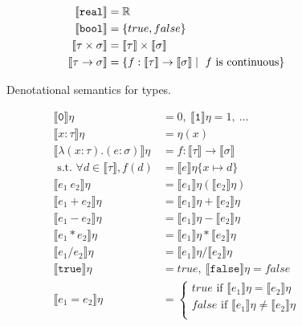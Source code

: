 \begin{figure}
 \begin{align*}
\llbracket \texttt{real} \rrbracket &= \mathbb{R} \\
 \llbracket \texttt{bool} \rrbracket &= {\{true, false\}} \\
 \llbracket \tau \times \sigma \rrbracket &= \llbracket \tau \rrbracket \times \llbracket \sigma \rrbracket  \\
 \llbracket \tau \rightarrow \sigma \rrbracket &= \{f: \llbracket \tau \rrbracket \rightarrow \llbracket \sigma \rrbracket \mid
 \ f \text{ is continuous}\} 
 \end{align*}
 \caption{Denotational semantics for types.}
 \label{fig:densemtypes}
 \end{figure}
 \begin{figure}
\begin{align*}
 \llbracket \texttt{0} \rrbracket\eta &= 0, \  \llbracket \texttt{1} \rrbracket\eta = 1, \ \ldots \\
  \llbracket x : \tau \rrbracket\eta &= \eta(x) \\
  \llbracket \lambda (x : \tau) . (e : \sigma) \rrbracket\eta &= f : \llbracket \tau \rrbracket \rightarrow \llbracket \sigma \rrbracket \\
\text{ s.t. } \forall d \in \llbracket \tau \rrbracket, f(d) &= \llbracket e \rrbracket\eta\{ x \mapsto d \} \\
 \llbracket e_1 \ e_2 \rrbracket \eta &= \llbracket e_1 \rrbracket\eta ( \llbracket e_2 \rrbracket\eta ) \\
 \llbracket e_1 + e_2 \rrbracket\eta &= \llbracket e_1 \rrbracket\eta + \llbracket e_2 \rrbracket\eta \\
 \llbracket e_1 - e_2 \rrbracket\eta &= \llbracket e_1 \rrbracket\eta - \llbracket e_2 \rrbracket\eta \\
 \llbracket e_1 * e_2 \rrbracket\eta &= \llbracket e_1 \rrbracket\eta * \llbracket e_2 \rrbracket\eta \\
  \llbracket e_1 / e_2 \rrbracket\eta &= \llbracket e_1 \rrbracket\eta / \llbracket e_2 \rrbracket\eta \\
  \llbracket \texttt{true} \rrbracket\eta &= true, \ \llbracket \texttt{false} \rrbracket\eta = false \\
 \llbracket e_1 = e_2 \rrbracket\eta &= 
 \begin{cases} 
      true \text{ if } \llbracket e_1 \rrbracket\eta = \llbracket e_2 \rrbracket\eta \\
      false \text{  if } \llbracket e_1 \rrbracket\eta \neq \llbracket e_2\rrbracket\eta \\

\end{cases}
\end{align*}
\end{figure}
